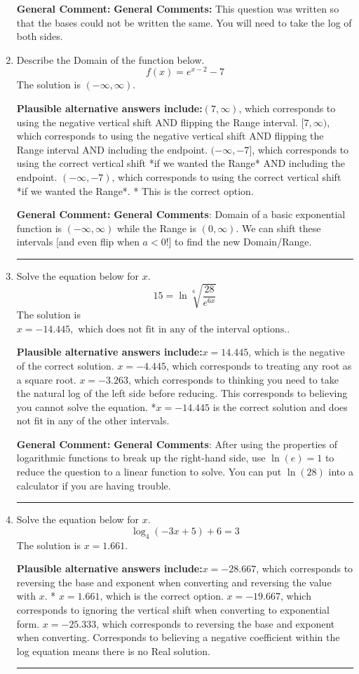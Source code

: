 \documentclass{extbook}[14pt]
\newcommand{\litem}[1]{\item #1

\rule{\textwidth}{0.4pt}}
\begin{document}
\begin{enumerate}
{\textbf{General Comment:} \textbf{General Comments:} This question was written so that the bases could not be written the same. You will need to take the log of both sides.
}
\litem{
Describe the Domain of the function below.
\[ f(x) = e^{x-2}-7 \]The solution is \( (-\infty, \infty) \).\begin{enumerate}[label=\Alph*.]
\textbf{Plausible alternative answers include:}$(7, \infty)$, which corresponds to using the negative vertical shift AND flipping the Range interval.
$[7, \infty)$, which corresponds to using the negative vertical shift AND flipping the Range interval AND including the endpoint.
$(-\infty, -7]$, which corresponds to using the correct vertical shift *if we wanted the Range* AND including the endpoint.
$(-\infty, -7)$, which corresponds to using the correct vertical shift *if we wanted the Range*.
* This is the correct option.
\end{enumerate}

\textbf{General Comment:} \textbf{General Comments}: Domain of a basic exponential function is $(-\infty, \infty)$ while the Range is $(0, \infty)$. We can shift these intervals [and even flip when $a<0$!] to find the new Domain/Range.
}
\litem{
Solve the equation below for $x$.
\[  15 = \ln{\sqrt[6]{\frac{28}{e^{6x}}}} \]The solution is \( x = -14.445, \text{ which does not fit in any of the interval options.} \).\begin{enumerate}[label=\Alph*.]
\textbf{Plausible alternative answers include:}$x = 14.445$, which is the negative of the correct solution.
$x = -4.445$, which corresponds to treating any root as a square root.
$x = -3.263$, which corresponds to thinking you need to take the natural log of the left side before reducing.
This corresponds to believing you cannot solve the equation.
*$x = -14.445$ is the correct solution and does not fit in any of the other intervals.
\end{enumerate}

\textbf{General Comment:} \textbf{General Comments}: After using the properties of logarithmic functions to break up the right-hand side, use $\ln(e) = 1$ to reduce the question to a linear function to solve. You can put $\ln(28)$ into a calculator if you are having trouble.
}
\litem{
Solve the equation below for $x$.
\[ \log_{4}{(-3x+5)}+6 = 3 \]The solution is \( x = 1.661 \).\begin{enumerate}[label=\Alph*.]
\textbf{Plausible alternative answers include:}$x = -28.667$, which corresponds to reversing the base and exponent when converting and reversing the value with $x$.
* $x = 1.661$, which is the correct option.
$x = -19.667$, which corresponds to ignoring the vertical shift when converting to exponential form.
$x = -25.333$, which corresponds to reversing the base and exponent when converting.
Corresponds to believing a negative coefficient within the log equation means there is no Real solution.
\end{enumerate}

}
\end{enumerate}
\end{document}
